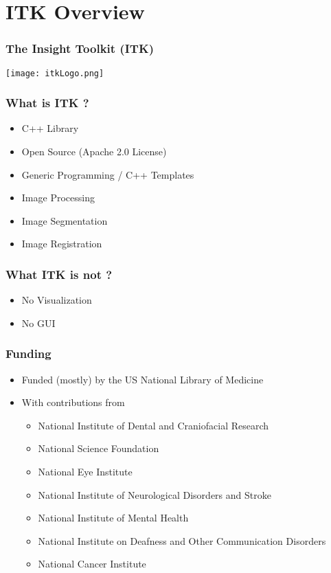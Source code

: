 \section{ITK Overview}



\begin{frame}[fragile]
\frametitle{The Insight Toolkit (ITK)}
\begin{center}
  \texttt{[image: itkLogo.png]}
\end{center}
\end{frame}

\begin{frame}
\frametitle{What is ITK ?}
\begin{itemize}
\item C++ Library
\pause
\item Open Source (Apache 2.0 License)
\pause
\item Generic Programming / C++ Templates
\pause
\item Image Processing
\pause
\item Image Segmentation
\pause
\item Image Registration
\end{itemize}
\end{frame}


\begin{frame}
\frametitle{What ITK is not ?}
\begin{itemize}
\item No Visualization
\pause
\item No GUI
\end{itemize}
\end{frame}

\begin{frame}
\frametitle{Funding}
\begin{itemize}
\item Funded (mostly) by the US National Library of Medicine
\pause
\item With contributions from
\begin{itemize}
\item National Institute of Dental and Craniofacial Research
\item National Science Foundation
\item National Eye Institute
\item National Institute of Neurological Disorders and Stroke
\item National Institute of Mental Health
\item National Institute on Deafness and Other Communication Disorders
\item National Cancer Institute
\end{itemize}
\end{itemize}
\end{frame}

